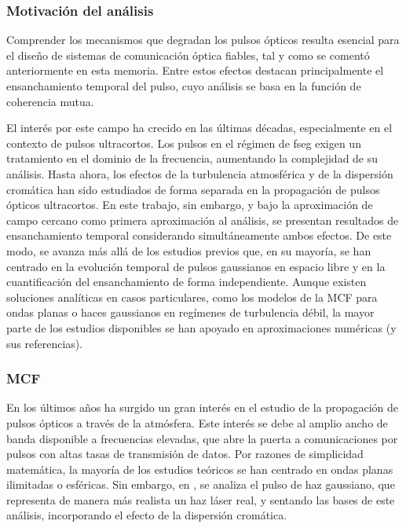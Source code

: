 \subsubsection{Motivación del análisis}
Comprender los mecanismos que degradan los pulsos ópticos resulta esencial para el diseño de sistemas de comunicación óptica fiables, tal y como se comentó anteriormente en esta memoria. Entre estos efectos destacan principalmente el ensanchamiento temporal del pulso, cuyo análisis se basa en la función de coherencia mutua.

El interés por este campo ha crecido en las últimas décadas, especialmente en el contexto de pulsos ultracortos. Los pulsos en el régimen de fseg exigen un tratamiento en el dominio de la frecuencia, aumentando la complejidad de su análisis. Hasta ahora, los efectos de la turbulencia atmosférica y de la dispersión cromática han sido estudiados de forma separada en la propagación de pulsos ópticos ultracortos. En este trabajo, sin embargo, y bajo la aproximación de campo cercano como primera aproximación al análisis, se presentan resultados de ensanchamiento temporal considerando simultáneamente ambos efectos. De este modo, se avanza más allá de los estudios previos que, en su mayoría, se han centrado en la evolución temporal de pulsos gaussianos en espacio libre y en la cuantificación del ensanchamiento de forma independiente. Aunque existen soluciones analíticas en casos particulares, como los modelos de la MCF para ondas planas o haces gaussianos en regímenes de turbulencia débil, la mayor parte de los estudios disponibles se han apoyado en aproximaciones numéricas \cite{Andrews} (y sus referencias).

\subsubsection{MCF}
En los últimos años ha surgido un gran interés en el estudio de la propagación de pulsos ópticos a través de la atmósfera. Este interés se debe al amplio ancho de banda disponible a frecuencias elevadas, que abre la puerta a comunicaciones por pulsos con altas tasas de transmisión de datos. Por razones de simplicidad matemática, la mayoría de los estudios teóricos se han centrado en ondas planas ilimitadas o esféricas. Sin embargo, en \cite{Young1996}, se analiza el pulso de haz gaussiano, que representa de manera más realista un haz láser real, y sentando las bases de este análisis, incorporando el efecto de la dispersión cromática.

